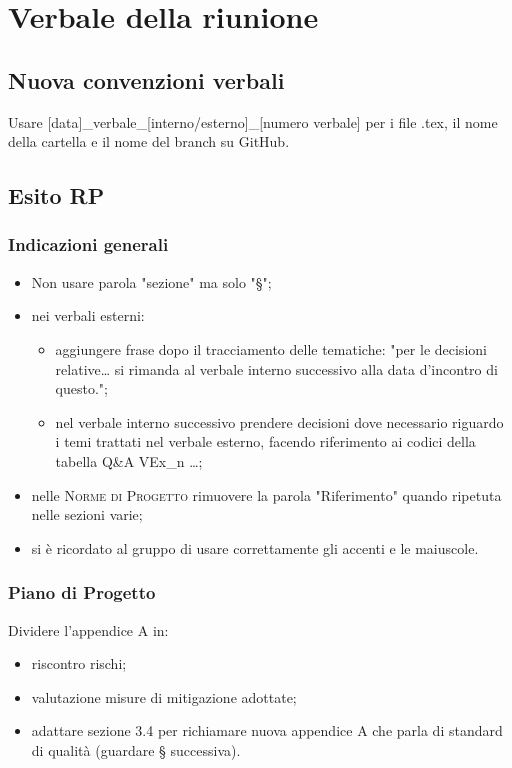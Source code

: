 \section{Verbale della riunione}

\subsection{Nuova convenzioni verbali}
Usare [data]\_verbale\_[interno/esterno]\_[numero verbale] per i file .tex, il nome della cartella e il nome del branch su GitHub.

\subsection{Esito RP}

\subsubsection{Indicazioni generali}
\begin{itemize}
	\item Non usare parola "sezione" ma solo "§";
	\item nei verbali esterni:
	\begin{itemize}
		\item aggiungere frase dopo il tracciamento delle tematiche: "per le decisioni relative… si rimanda al verbale interno successivo alla data d'incontro di questo.";
		\item nel verbale interno successivo prendere decisioni dove necessario riguardo i temi trattati nel verbale esterno, facendo riferimento ai codici della tabella Q\&A VEx\_n …;
	\end{itemize}
	\item nelle \textsc{Norme di Progetto} rimuovere la parola "Riferimento" quando ripetuta nelle sezioni varie;
	\item si è ricordato al gruppo di usare correttamente gli accenti e le maiuscole.
\end{itemize}

\subsubsection{Piano di Progetto}
Dividere l'appendice A in:
\begin{itemize}
	\item riscontro rischi;
	\item valutazione misure di mitigazione adottate;
	\item adattare sezione 3.4 per richiamare nuova appendice A che parla di standard di qualità (guardare § successiva).
\end{itemize}

